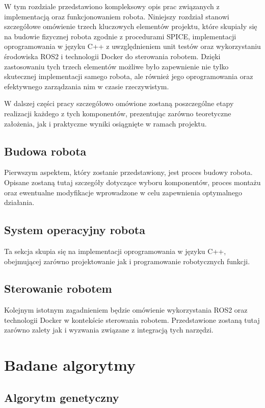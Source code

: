 \documentclass[12pt,twoside]{article}
\begin{document}
W tym rozdziale przedstawiono kompleksowy opis prac związanych z implementacją oraz funkcjonowaniem robota. Niniejszy rozdział stanowi szczegółowe omówienie trzech kluczowych elementów projektu, które skupiały się na budowie fizycznej robota zgodnie z procedurami SPICE, implementacji oprogramowania w języku C++ z uwzględnieniem unit testów oraz wykorzystaniu środowiska ROS2 i technologii Docker do sterowania robotem. Dzięki zastosowaniu tych trzech elementów możliwe było zapewnienie nie tylko skutecznej implementacji samego robota, ale również jego oprogramowania oraz efektywnego zarządzania nim w czasie rzeczywistym.

W dalszej części pracy szczegółowo omówione zostaną poszczególne etapy realizacji każdego z tych komponentów, prezentując zarówno teoretyczne założenia, jak i praktyczne wyniki osiągnięte w ramach projektu.

\subsection{Budowa robota}

Pierwszym aspektem, który zostanie przedstawiony, jest proces budowy robota. Opisane zostaną tutaj szczegóły dotyczące wyboru komponentów, proces montażu oraz ewentualne modyfikacje wprowadzone w celu zapewnienia optymalnego działania.

\subsection{System operacyjny robota}

Ta sekcja skupia się na implementacji oprogramowania w języku C++, obejmującej zarówno projektowanie jak i programowanie robotycznych funkcji. 

\subsection{Sterowanie robotem}

Kolejnym istotnym zagadnieniem będzie omówienie wykorzystania ROS2 oraz technologii Docker w kontekście sterowania robotem. Przedstawione zostaną tutaj zarówno zalety jak i wyzwania związane z integracją tych narzędzi.

\section{Badane algorytmy}

\subsection{Algorytm genetyczny}
\end{document}

